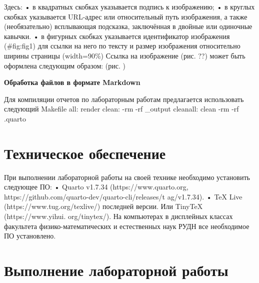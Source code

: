 \documentclass[
  english,
  russian,
  12pt,
  a4paper,
  DIV=11,
  numbers=noendperiod]{scrreprt}
\begin{document}
Здесь: • в квадратных скобках указывается подпись к изображению; • в
круглых скобках указывается URL-адрес или относительный путь
изображения, а также (необязательно) всплывающая подсказка, заключённая
в двойные или одиночные кавычки. • в фигурных скобках указывается
идентификатор изображения (\#fig:fig1) для ссылки на него по тексту и
размер изображения относительно ширины страницы (width=90\%) Ссылка на
изображение (рис. ??) может быть оформлена следующим образом: (рис.
\autocite*{fig:fig1})

\textbf{Обработка файлов в формате Markdown}

Для компиляции отчетов по лабораторным работам предлагается использовать
следующий Makefile all: \autocite*{quarto} render clean: -rm -rf
\_output cleanall: clean -rm -rf .quarto

\chapter{Техническое
обеспечение}\label{ux442ux435ux445ux43dux438ux447ux435ux441ux43aux43eux435-ux43eux431ux435ux441ux43fux435ux447ux435ux43dux438ux435}

При выполнении лабораторной работы на своей технике необходимо
установить следующее ПО: • Quarto v1.7.34 (https://www.quarto.org,
https://github.com/quarto-dev/quarto-cli/releases/t ag/v1.7.34). • TeX
Live (https://www.tug.org/texlive/) последней версии. Или TinyTeX
(https://www.yihui. org/tinytex/). На компьютерах в дисплейных классах
факультета физико-математических и естественных наук РУДН все
необходимое ПО установлено.

\chapter{Выполнение лабораторной
работы}\label{ux432ux44bux43fux43eux43bux43dux435ux43dux438ux435-ux43bux430ux431ux43eux440ux430ux442ux43eux440ux43dux43eux439-ux440ux430ux431ux43eux442ux44b}
\end{document}

